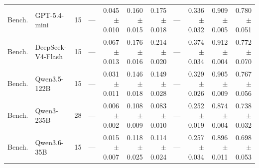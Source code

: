 \begin{table}[t]
{\begin{tabular}{llrrrrrrrrr}
Bench. & GPT-5.4-mini & 15 & --- & \shortstack[r]{0.045\\{\scriptsize $\pm$0.010}} & \shortstack[r]{0.160\\{\scriptsize $\pm$0.015}} & \shortstack[r]{0.175\\{\scriptsize $\pm$0.018}} & --- & \shortstack[r]{0.336\\{\scriptsize $\pm$0.032}} & \shortstack[r]{0.909\\{\scriptsize $\pm$0.005}} & \shortstack[r]{0.780\\{\scriptsize $\pm$0.051}} \\
Bench. & DeepSeek-V4-Flash & 15 & --- & \shortstack[r]{0.067\\{\scriptsize $\pm$0.013}} & \shortstack[r]{0.176\\{\scriptsize $\pm$0.016}} & \shortstack[r]{0.214\\{\scriptsize $\pm$0.020}} & --- & \shortstack[r]{0.374\\{\scriptsize $\pm$0.034}} & \shortstack[r]{0.912\\{\scriptsize $\pm$0.004}} & \shortstack[r]{0.772\\{\scriptsize $\pm$0.070}} \\
Bench. & Qwen3.5-122B & 15 & --- & \shortstack[r]{0.031\\{\scriptsize $\pm$0.011}} & \shortstack[r]{0.146\\{\scriptsize $\pm$0.018}} & \shortstack[r]{0.149\\{\scriptsize $\pm$0.028}} & --- & \shortstack[r]{0.329\\{\scriptsize $\pm$0.026}} & \shortstack[r]{0.905\\{\scriptsize $\pm$0.009}} & \shortstack[r]{0.767\\{\scriptsize $\pm$0.056}} \\
Bench. & Qwen3-235B & 28 & --- & \shortstack[r]{0.006\\{\scriptsize $\pm$0.002}} & \shortstack[r]{0.108\\{\scriptsize $\pm$0.009}} & \shortstack[r]{0.083\\{\scriptsize $\pm$0.010}} & --- & \shortstack[r]{0.252\\{\scriptsize $\pm$0.019}} & \shortstack[r]{0.874\\{\scriptsize $\pm$0.004}} & \shortstack[r]{0.738\\{\scriptsize $\pm$0.032}} \\
Bench. & Qwen3.6-35B & 15 & --- & \shortstack[r]{0.015\\{\scriptsize $\pm$0.007}} & \shortstack[r]{0.118\\{\scriptsize $\pm$0.025}} & \shortstack[r]{0.114\\{\scriptsize $\pm$0.024}} & --- & \shortstack[r]{0.257\\{\scriptsize $\pm$0.034}} & \shortstack[r]{0.896\\{\scriptsize $\pm$0.011}} & \shortstack[r]{0.698\\{\scriptsize $\pm$0.053}} \\

\end{tabular}}
\end{table}
